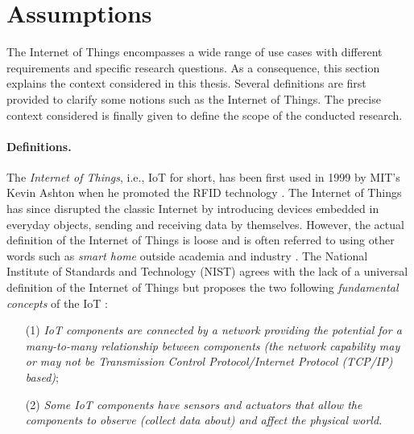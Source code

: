 \section{Assumptions}
\label{S_assumptions}

The Internet of Things encompasses a wide range of use cases with different requirements and specific research questions. As a consequence, this section explains the context considered in this thesis. Several definitions are first provided to clarify some notions such as the Internet of Things.  The precise context considered is finally given to define the scope of the conducted research.

\paragraph{Definitions.} The \emph{Internet of Things}, i.e., IoT for short, has been first used in 1999 by MIT's Kevin Ashton when he promoted the RFID technology \cite{Zhang2020}. The Internet of Things has since disrupted the classic Internet by introducing devices embedded in everyday objects, sending and receiving data by themselves. However, the actual definition of the Internet of Things is loose and is often referred to using other words such as \emph{smart home} outside academia and industry \cite{Berte2018}. The National Institute of Standards and Technology (NIST) agrees with the lack of a universal definition of the Internet of Things but proposes the two following \emph{fundamental concepts} of the IoT \cite{NISTIR8200}:
\begin{center}
\begin{mdframed}[ skipabove=20pt, skipbelow=20pt, innertopmargin=12pt, innerbottommargin=12pt] 
\begin{itemize}
    
    \item[(1)] \emph{IoT components are connected by a network providing the potential for a many-to-many
relationship between components (the network capability may or may not be
Transmission Control Protocol/Internet Protocol (TCP/IP) based)};
    \item[(2)] \emph{Some IoT components have sensors and actuators that allow the components to observe
(collect data about) and affect the physical world.}
\end{itemize}
\end{mdframed} 
\end{center}

